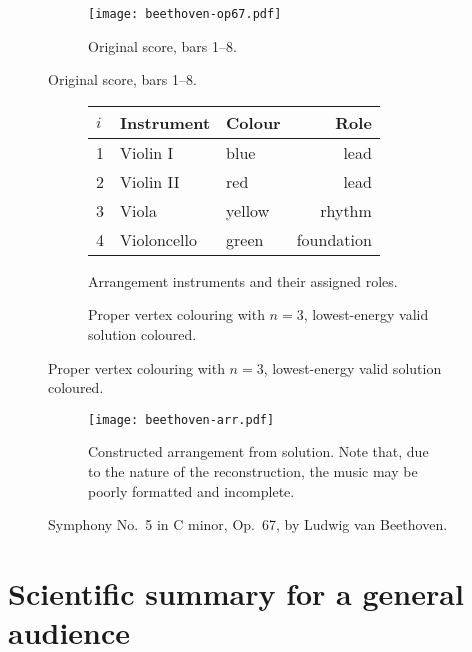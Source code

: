 \documentclass[12pt]{article}
\theoremstyle{definition}
\begin{document}
\begin{figure}[ht]
    \centering
    \begin{subfigure}{\textwidth}
        \texttt{[image: beethoven-op67.pdf]}
        \caption{Original score, bars 1--8.}
    \end{subfigure}
\end{figure}
\begin{figure}[ht]
    \ContinuedFloat
    \centering
    \begin{subfigure}{\textwidth}
        \centering\setlength{\tabcolsep}{12pt}
        \begin{tabular}{lllr}
            \toprule
            $i$ & \textbf{Instrument} & \textbf{Colour} & \textbf{Role} \\
            \midrule
            1 & Violin I & blue & lead \\
            2 & Violin II & red & lead \\
            3 & Viola & yellow & rhythm \\
            4 & Violoncello & green & foundation \\
            \bottomrule
        \end{tabular}
        \caption{Arrangement instruments and their assigned roles.}
    \end{subfigure}
    \begin{subfigure}{\textwidth}
        
        \caption{Proper vertex colouring with $n=3$, lowest-energy valid solution coloured.}
    \end{subfigure}
\end{figure}
\begin{figure}[ht]
    \ContinuedFloat
    \begin{subfigure}{\textwidth}
        \texttt{[image: beethoven-arr.pdf]}
        \caption{Constructed arrangement from solution. Note that, due to the nature of the reconstruction, the music may be poorly formatted and incomplete.}
    \end{subfigure}
    \caption{Symphony No.\ 5 in C minor, Op.\ 67, by Ludwig van Beethoven.}
\end{figure}

\clearpage

\section*{Scientific summary for a general audience} %
\end{document}
